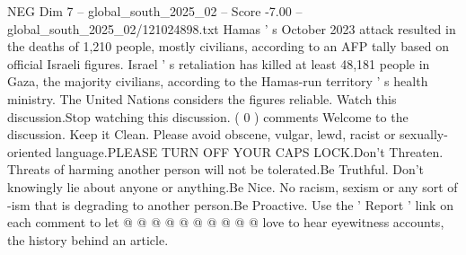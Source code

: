 \begin{textsample}{NEG Dim 7 – global\_south\_2025\_02 – Score -7.00 – global\_south\_2025\_02/121024898.txt}
Hamas ' s October 2023 attack resulted in the deaths of 1,210 people, mostly civilians, according to an AFP tally based on official Israeli figures.
Israel ' s retaliation has killed at least 48,181 people in Gaza, the majority civilians, according to the Hamas-run territory ' s health ministry.
The United Nations considers the figures reliable.
Watch this discussion.Stop watching this discussion. ( 0 ) comments Welcome to the discussion.
Keep it Clean.
Please avoid obscene, vulgar, lewd, racist or sexually-oriented language.PLEASE TURN OFF YOUR CAPS LOCK.Don't Threaten.
Threats of harming another person will not be tolerated.Be Truthful.
Don't knowingly lie about anyone or anything.Be Nice.
No racism, sexism or any sort of -ism that is degrading to another person.Be Proactive.
Use the ' Report ' link on each comment to let @ @ @ @ @ @ @ @ @ @ love to hear eyewitness accounts, the history behind an article.

\end{textsample}
